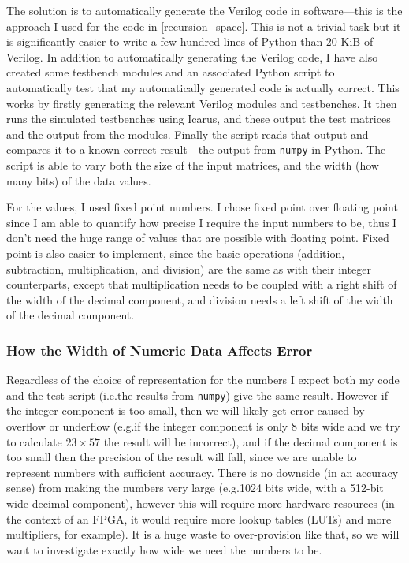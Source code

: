 \documentclass[12pt]{article}
\begin{document}
The solution is to automatically generate the Verilog code in software---this is the approach I used for the code in \ref{recursion_space}. This is not a trivial task but it is significantly easier to write a few hundred lines of Python than 20 KiB of Verilog. In addition to automatically generating the Verilog code, I have also created some testbench modules and an associated Python script to automatically test that my automatically generated code is actually correct. This works by firstly generating the relevant Verilog modules and testbenches. It then runs the simulated testbenches using Icarus, and these output the test matrices and the output from the modules. Finally the script reads that output and compares it to a known correct result---the output from \lstinline|numpy| in Python. The script is able to vary both the size of the input matrices, and the width (how many bits) of the data values.

For the values, I used fixed point numbers. I chose fixed point over floating point since I am able to quantify how precise I require the input numbers to be, thus I don't need the huge range of values that are possible with floating point. Fixed point is also easier to implement, since the basic operations (addition, subtraction, multiplication, and division) are the same as with their integer counterparts, except that multiplication needs to be coupled with a right shift of the width of the decimal component, and division needs a left shift of the width of the decimal component.

\subsubsection{How the Width of Numeric Data Affects Error}

Regardless of the choice of representation for the numbers I expect both my code and the test script (i.e.\@ the results from \lstinline|numpy|) give the same result. However if the integer component is too small, then we will likely get error caused by overflow or underflow (e.g.\@ if the integer component is only 8 bits wide and we try to calculate $23 \times 57$ the result will be incorrect), and if the decimal component is too small then the precision of the result will fall, since we are unable to represent numbers with sufficient accuracy. There is no downside (in an accuracy sense) from making the numbers very large (e.g.\@ 1024 bits wide, with a 512-bit wide decimal component), however this will require more hardware resources (in the context of an FPGA, it would require more lookup tables (LUTs) and more multipliers, for example). It is a huge waste to over-provision like that, so we will want to investigate exactly how wide we need the numbers to be.
\end{document}
